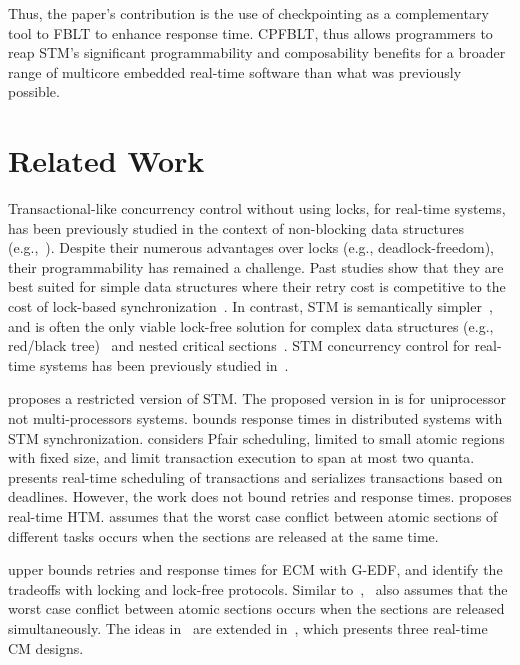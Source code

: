 \documentclass[conference]{IEEEtran}
\begin{document}
Thus, the paper's contribution is the use of checkpointing as a complementary tool to FBLT to enhance response time. CPFBLT, thus allows programmers to reap STM's significant programmability and composability benefits for a broader range of multicore embedded real-time software than what was previously possible.

\section{Related Work}
\label{sec:past}

Transactional-like concurrency control without using locks, for real-time systems, has been previously studied in the context of non-blocking data structures (e.g.,~\cite{anderson95realtime}). Despite their numerous advantages over locks 
(e.g., deadlock-freedom), their programmability has remained a challenge. Past studies show that they are best suited for simple data structures where their retry cost is competitive to the cost of lock-based synchronization~\cite{bc+08}.  In contrast, STM is semantically simpler~\cite{Herlihy:2006:AMP:1146381.1146382}, and is often the only viable lock-free solution for complex data structures (e.g., red/black tree)~\cite{key-1} and nested critical sections~\cite{Saha:2006:MHP:1122971.1123001}. STM concurrency control for real-time systems has been previously studied in~\cite{manson2006preemptible,fahmy2009bounding,sarni2009real,schoeberl2010rttm,key-1,barrosmanaging,stmconcurrencycontrol:emsoft11,lcmdac2012,pnf_dac_asp,fblt}.

\cite{manson2006preemptible} proposes a restricted version of STM. The proposed version in \cite{manson2006preemptible} is for uniprocessor not multi-processors systems. \cite{fahmy2009bounding} bounds response times in distributed  systems with STM synchronization. \cite{fahmy2009bounding} considers Pfair scheduling, limited to small atomic regions with fixed size, and limit transaction execution to span at most two quanta. \cite{sarni2009real} presents real-time scheduling of transactions and serializes transactions based on deadlines. However, the work does not bound retries and response times. \cite{schoeberl2010rttm} proposes real-time HTM. \cite{schoeberl2010rttm} assumes that the worst case conflict between atomic sections of different tasks occurs when the sections are released at the same time. 

\cite{key-1} upper bounds retries and response times for ECM with G-EDF, and identify the tradeoffs with locking and lock-free protocols. Similar to~\cite{schoeberl2010rttm},~\cite{key-1} also assumes that the worst case conflict between atomic sections occurs when the sections are released simultaneously. The ideas in~\cite{key-1} are extended in~\cite{barrosmanaging}, which presents three real-time CM designs.
 
\end{document}
